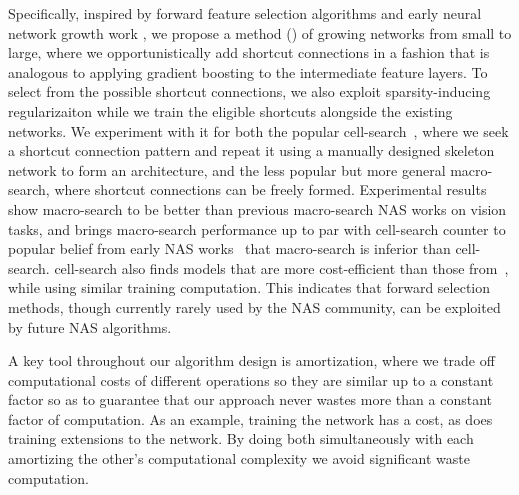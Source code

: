Specifically, inspired by forward feature selection algorithms and
early neural network growth work \citep{cascadecorr}, we propose a
method (\Petridish) of growing networks from small to large, where we
opportunistically add shortcut connections in a fashion that is
analogous to applying gradient boosting to the intermediate feature
layers. To select from the possible shortcut connections, we also
exploit sparsity-inducing regularizaiton while we train the eligible
shortcuts alongside the existing networks. We experiment with it for
both the popular cell-search~\citep{NASCell}, where we seek a shortcut
connection pattern and repeat it using a manually designed skeleton
network to form an architecture, and the less popular but more general
macro-search, where shortcut connections can be freely formed.
Experimental results show \Petridish macro-search to be better than
previous macro-search NAS works on vision tasks, and brings
macro-search performance up to par with cell-search counter
to popular belief from early NAS works~\citep{nas,Pham2018EfficientNA}
that macro-search is inferior than cell-search.  \Petridish
cell-search also finds models that are more cost-efficient than those
from~\citep{Liu2018DARTSDA}, while using similar training
computation. This indicates that forward selection methods, though
currently rarely used by the NAS community, can be exploited by future
NAS algorithms.

A key tool throughout our algorithm design is amortization, where we
trade off computational costs of different operations so they are
similar up to a constant factor so as to guarantee that our approach
never wastes more than a constant factor of computation.  As an
example, training the network has a cost, as does training extensions
to the network.  By doing both simultaneously with each amortizing the
other's computational complexity we avoid significant waste
computation.

